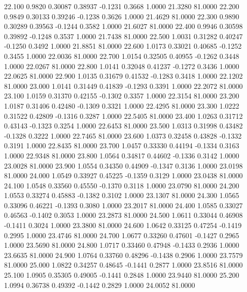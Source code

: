   22.100   0.9820   0.30087   0.38937  -0.1231   0.3668   1.0000  21.3280  81.0000
  22.200   0.9849   0.30133   0.39246  -0.1238   0.3626   1.0000  21.4629  81.0000
  22.300   0.9890   0.30289   0.39563  -0.1244   0.3582   1.0000  21.6027  81.0000
  22.400   0.9946   0.30598   0.39892  -0.1248   0.3537   1.0000  21.7438  81.0000
  22.500   1.0031   0.31282   0.40247  -0.1250   0.3492   1.0000  21.8851  81.0000
  22.600   1.0173   0.33021   0.40685  -0.1252   0.3455   1.0000  22.0036  81.0000
  22.700   1.0154   0.32505   0.40955  -0.1262   0.3448   1.0000  22.0267  81.0000
  22.800   1.0141   0.32048   0.41237  -0.1272   0.3436   1.0000  22.0625  81.0000
  22.900   1.0135   0.31679   0.41532  -0.1283   0.3418   1.0000  22.1202  81.0000
  23.000   1.0141   0.31449   0.41839  -0.1293   0.3391   1.0000  22.2072  81.0000
  23.100   1.0159   0.31370   0.42155  -0.1302   0.3357   1.0000  22.3154  81.0000
  23.200   1.0187   0.31406   0.42480  -0.1309   0.3321   1.0000  22.4295  81.0000
  23.300   1.0222   0.31522   0.42809  -0.1316   0.3287   1.0000  22.5405  81.0000
  23.400   1.0263   0.31712   0.43143  -0.1323   0.3254   1.0000  22.6453  81.0000
  23.500   1.0313   0.31998   0.43482  -0.1328   0.3222   1.0000  22.7465  81.0000
  23.600   1.0373   0.32458   0.43828  -0.1332   0.3191   1.0000  22.8435  81.0000
  23.700   1.0457   0.33330   0.44194  -0.1334   0.3163   1.0000  22.9348  81.0000
  23.800   1.0564   0.34817   0.44602  -0.1336   0.3142   1.0000  23.0028  81.0000
  23.900   1.0554   0.34350   0.44909  -0.1347   0.3136   1.0000  23.0198  81.0000
  24.000   1.0549   0.33927   0.45225  -0.1359   0.3129   1.0000  23.0438  81.0000
  24.100   1.0548   0.33560   0.45550  -0.1370   0.3118   1.0000  23.0790  81.0000
  24.200   1.0553   0.33274   0.45883  -0.1382   0.3102   1.0000  23.1307  81.0000
  24.300   1.0565   0.33096   0.46221  -0.1393   0.3080   1.0000  23.2017  81.0000
  24.400   1.0585   0.33027   0.46563  -0.1402   0.3053   1.0000  23.2873  81.0000
  24.500   1.0611   0.33044   0.46908  -0.1411   0.3024   1.0000  23.3800  81.0000
  24.600   1.0642   0.33125   0.47254  -0.1419   0.2995   1.0000  23.4746  81.0000
  24.700   1.0677   0.33260   0.47601  -0.1427   0.2965   1.0000  23.5690  81.0000
  24.800   1.0717   0.33460   0.47948  -0.1433   0.2936   1.0000  23.6635  81.0000
  24.900   1.0764   0.33760   0.48296  -0.1438   0.2906   1.0000  23.7579  81.0000
  25.000   1.0822   0.34257   0.48645  -0.1441   0.2877   1.0000  23.8516  81.0000
  25.100   1.0905   0.35305   0.49005  -0.1441   0.2848   1.0000  23.9440  81.0000
  25.200   1.0994   0.36738   0.49392  -0.1442   0.2829   1.0000  24.0052  81.0000
